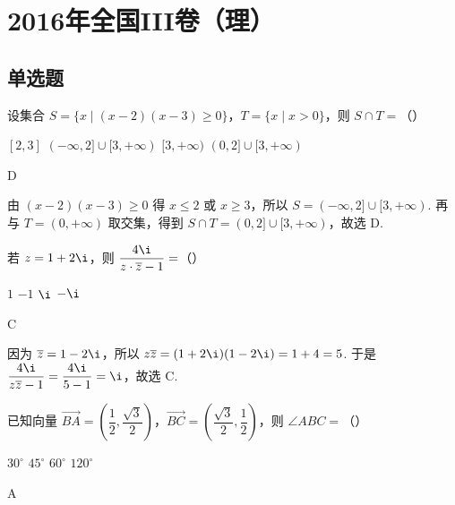 \chapter{2016年全国III卷（理）}

\section{单选题}

\begin{problem}
设集合 \(S=\{x\mid (x-2)(x-3)\ge0\}\)，\(T=\{x\mid x>0\}\)，则 \(S\cap T=\)（\quad）

\choices
    {\([2,3]\)}
    {\((-\infty,2]\cup[3,+\infty)\)}
    {\([3,+\infty)\)}
    {\((0,2]\cup[3,+\infty)\)}
\end{problem}

\begin{answer}
D
\end{answer}

\begin{solution}
由 \((x-2)(x-3)\ge0\) 得 \(x\le2\) 或 \(x\ge3\)，所以 \(S=(-\infty,2]\cup[3,+\infty)\). 再与 \(T=(0,+\infty)\) 取交集，得到 \(S\cap T=(0,2]\cup[3,+\infty)\)，故选 D.
\end{solution}

\begin{problem}
若 \(z=1+2\i\)，则 \(\dfrac{4\i}{z\cdot \overline z-1}=\)（\quad）

\choices
    {\(1\)}
    {\(-1\)}
    {\(\i\)}
    {\(-\i\)}
\end{problem}

\begin{answer}
C
\end{answer}

\begin{solution}
因为 \(\overline z=1-2\i\)，所以 \(z\overline z=(1+2\i)(1-2\i)=1+4=5\). 于是 \(\dfrac{4\i}{z\overline z-1}=\dfrac{4\i}{5-1}=\i\)，故选 C.
\end{solution}

\begin{problem}
已知向量 \(\overrightarrow{BA}=\left(\dfrac12,\dfrac{\sqrt3}{2}\right)\)，\(\overrightarrow{BC}=\left(\dfrac{\sqrt3}{2},\dfrac12\right)\)，则 \(\angle ABC=\)（\quad）

\choices
    {\(30^\circ\)}
    {\(45^\circ\)}
    {\(60^\circ\)}
    {\(120^\circ\)}
\end{problem}

\begin{answer}
A
\end{answer}

